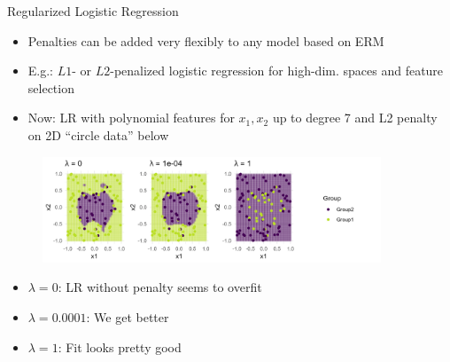\documentclass[11pt,compress,t,notes=noshow, xcolor=table]{beamer}
\begin{document}
\begin{vbframe}{Regularized Logistic Regression}

\begin{itemize}

\item Penalties can be added very flexibly to any model based on ERM

\item E.g.: $L1$- or $L2$-penalized logistic regression for high-dim. spaces and feature selection



\item Now: LR with polynomial features for $x_1, x_2$ up to degree 7 and L2 penalty on 2D ``circle data'' below

\end{itemize}

\begin{figure}
\includegraphics[width=0.9\textwidth]{figure/reg_logreg.png}\\
\end{figure}

\begin{itemize}
\item $\lambda = 0$: LR without penalty seems to overfit
\item $\lambda = 0.0001$: We get better
\item $\lambda = 1$: Fit looks pretty good
\end{itemize}


\end{vbframe}


\endlecture
\end{document}
